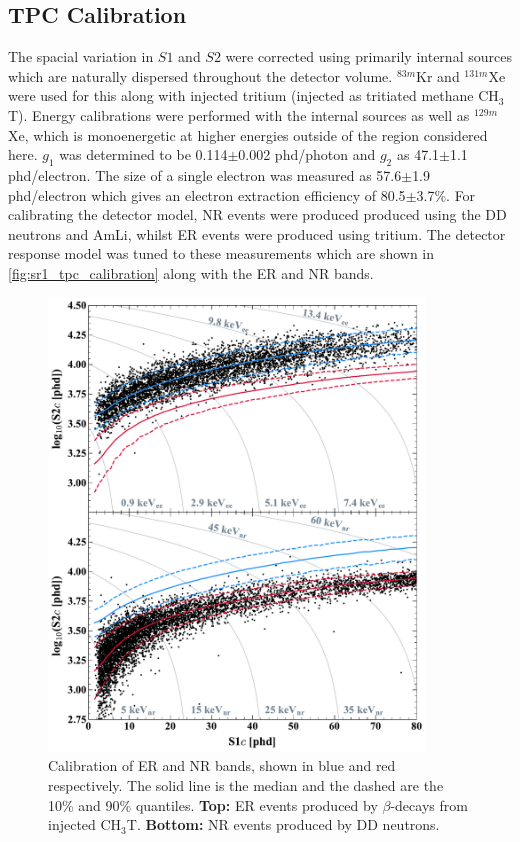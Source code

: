 \subsection{TPC Calibration}
\par
The spacial variation in $S1$ and $S2$ were corrected using primarily internal sources which are naturally dispersed throughout the detector volume.
${}^{83m}$Kr and ${}^{131m}$Xe were used for this along with injected tritium (injected as tritiated methane CH$_3$T).
Energy calibrations were performed with the internal sources as well as ${}^{129m}$Xe, which is monoenergetic at higher energies outside of the region considered here.
$g_1$ was determined to be 0.114$\pm$0.002 phd/photon and $g_2$ as 47.1$\pm$1.1 phd/electron.
The size of a single electron was measured as 57.6$\pm$1.9 phd/electron which gives an electron extraction efficiency of 80.5$\pm$3.7\%.
For calibrating the detector model, NR events were produced produced using the DD neutrons and AmLi, whilst ER events were produced using tritium.
The detector response model was tuned to these measurements which are shown in \autoref{fig:sr1_tpc_calibration} along with the ER and NR bands.
\begin{figure}
    \centering
    \includegraphics[width=10cm]{Figures/EFT/All_SR1_Plots/SR1WS_calOnly_0629_twoPanel.pdf}
    \caption{Calibration of ER and NR bands, shown in blue and red respectively.
             The solid line is the median and the dashed are the 10\% and 90\% quantiles.
             \textbf{Top:} ER events produced by $\beta$-decays from injected CH$_3$T.
             \textbf{Bottom:} NR events produced by DD neutrons.
             }
    \label{fig:sr1_tpc_calibration}
\end{figure}


